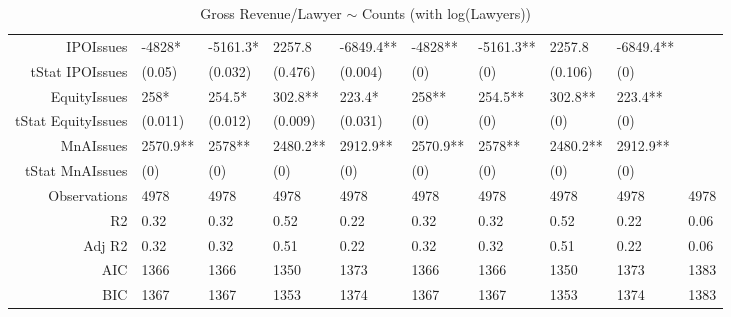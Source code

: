 \begin{table}[ht]
\begin{tabular}{rlllllllll}
  IPOIssues & -4828* & -5161.3* & 2257.8 & -6849.4** & -4828** & -5161.3** & 2257.8 & -6849.4** &  \\ 
  tStat IPOIssues & (0.05) & (0.032) & (0.476) & (0.004) & (0) & (0) & (0.106) & (0) &  \\ 
  EquityIssues & 258* & 254.5* & 302.8** & 223.4* & 258** & 254.5** & 302.8** & 223.4** &  \\ 
  tStat EquityIssues & (0.011) & (0.012) & (0.009) & (0.031) & (0) & (0) & (0) & (0) &  \\ 
  MnAIssues & 2570.9** & 2578** & 2480.2** & 2912.9** & 2570.9** & 2578** & 2480.2** & 2912.9** &  \\ 
  tStat MnAIssues & (0) & (0) & (0) & (0) & (0) & (0) & (0) & (0) &  \\ 
  Observations & 4978 & 4978 & 4978 & 4978 & 4978 & 4978 & 4978 & 4978 & 4978 \\ 
  R2 & 0.32 & 0.32 & 0.52 & 0.22 & 0.32 & 0.32 & 0.52 & 0.22 & 0.06 \\ 
  Adj R2 & 0.32 & 0.32 & 0.51 & 0.22 & 0.32 & 0.32 & 0.51 & 0.22 & 0.06 \\ 
  AIC & 1366 & 1366 & 1350 & 1373 & 1366 & 1366 & 1350 & 1373 & 1383 \\ 
  BIC & 1367 & 1367 & 1353 & 1374 & 1367 & 1367 & 1353 & 1374 & 1383 \\ 
   \hline
\end{tabular}
\caption{Gross Revenue/Lawyer $\sim$ Counts (with log(Lawyers))} 
\end{table}
